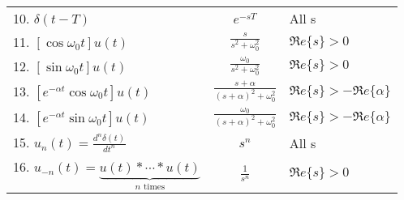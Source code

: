 \documentclass[12pt]{article}
\numberwithin{equation}{section}
\newcommand{\R}{\mbox{$\Re e\{s\}$}}
\begin{document}
\begin{table}[htbp]
\begin{center}
\begin{tabular}{l|c|l}
      10. $\delta(t-T)$ & $e^{-sT}$ &All s \\
      11. $[\cos
      \omega_{0}t]u(t)$ & $\displaystyle\frac{s}{s^{2}+
        \omega^{2}_{0}}$ &$\R > 0$ \\
      12. $[\sin \omega_{0}t]u(t)$ &
      $\displaystyle\frac{\omega_{0}}{s^{2}+ \omega^{2}_{0}}$ &$\R >
      0$ \\
      13. $[e^{-\alpha t}\cos \omega_{0}t]u(t)$
      &$\displaystyle\frac{s + \alpha}{(s+\alpha)^{2} +
        \omega^{2}_{0}}$ &$\R > -\Re e\{ \alpha\} $\\
      14. $[e^{-\alpha t}\sin
      \omega_{0}t]u(t)$ &$\displaystyle\frac{\omega_{0}}{(s +
        \alpha)^{2} + \omega^{2}_{0}}$ &$\R >-\Re e\{ \alpha\} $ \\
      15. $u_n(t)=\displaystyle\frac{d^{n}\delta(t)}{dt^{n}}$&$s^{n}$
      &All s \\
      16. $u_{-n}(t)=\underbrace{u(t)\ast \cdots \ast u(t)}_{n \text{ times}}$
      &$\displaystyle\frac{1}{s^{n}}$ &$\R > 0$ \\
    \end{tabular}
  \end{center}
\end{table}
\clearpage

%
%
\end{document}
